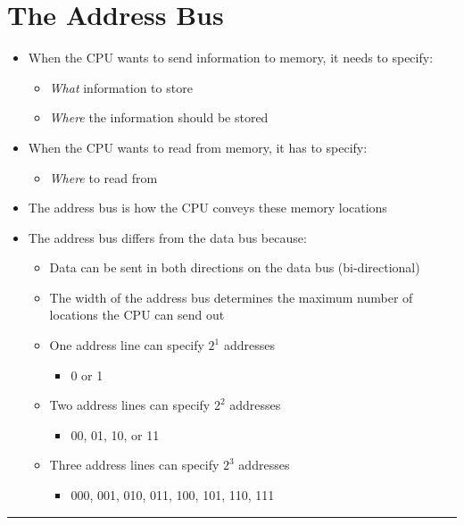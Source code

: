 \documentclass{article}
\begin{document}
  \section{The Address Bus}
  \begin{itemize}
    \item{When the CPU wants to send information to memory, it needs to specify:}
    \begin{itemize}
      \item{\textit{What} information to store}
      \item{\textit{Where} the information should be stored}
    \end{itemize}
    \item{When the CPU wants to read from memory, it has to specify:}
    \begin{itemize}
      \item{\textit{Where} to read from}
    \end{itemize}
    \item{The address bus is how the CPU conveys these memory locations}
    \item{The address bus differs from the data bus because:}
    \begin{itemize}
      \item{Data can be sent in both directions on the data bus (bi-directional)}
      \item{The width of the address bus determines the maximum number of locations the CPU can send out}
      \item{One address line can specify $2^1$ addresses}
      \begin{itemize}
        \item{0 or 1}
      \end{itemize}
      \item{Two address lines can specify $2^2$ addresses}
      \begin{itemize}
        \item{00, 01, 10, or 11}
      \end{itemize}
      \item{Three address lines can specify $2^3$ addresses}
      \begin{itemize}
        \item{000, 001, 010, 011, 100, 101, 110, 111}
      \end{itemize}
    \end{itemize}
  \end{itemize}

  \begin{center}
    \rule{0.5\textwidth}{0.4pt}
  \end{center}
\end{document}
